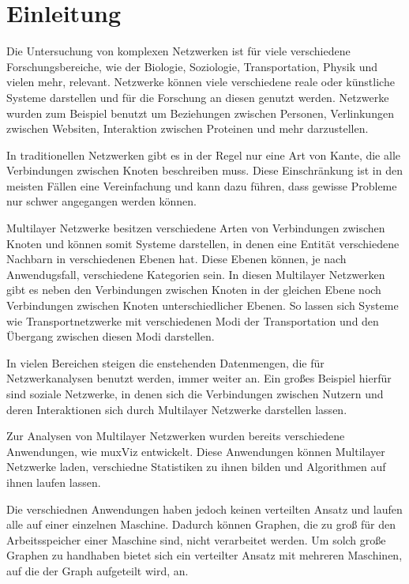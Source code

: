 \chapter{Einleitung}


Die Untersuchung von komplexen Netzwerken ist für viele verschiedene Forschungsbereiche, wie der Biologie, Soziologie, Transportation, Physik und vielen mehr, relevant. 
Netzwerke können viele verschiedene reale oder künstliche Systeme darstellen und für die Forschung an diesen genutzt werden. Netzwerke wurden zum Beispiel benutzt um Beziehungen zwischen Personen, Verlinkungen zwischen Websiten, Interaktion zwischen Proteinen und mehr darzustellen.

In traditionellen Netzwerken gibt es in der Regel nur eine Art von Kante, die alle Verbindungen zwischen Knoten beschreiben muss.
Diese Einschränkung ist in den meisten Fällen eine Vereinfachung und kann dazu führen, dass gewisse Probleme nur schwer angegangen werden können. 

Multilayer Netzwerke besitzen verschiedene Arten von Verbindungen zwischen Knoten und können somit Systeme darstellen, in denen eine Entität verschiedene Nachbarn in verschiedenen Ebenen hat.
Diese Ebenen können, je nach Anwendugsfall, verschiedene Kategorien sein. In diesen Multilayer Netzwerken gibt es neben den Verbindungen zwischen Knoten in der gleichen Ebene noch Verbindungen zwischen Knoten unterschiedlicher Ebenen.
So lassen sich Systeme wie Transportnetzwerke mit verschiedenen Modi der Transportation und den Übergang zwischen diesen Modi darstellen.

In vielen Bereichen steigen die enstehenden Datenmengen, die für Netzwerkanalysen benutzt werden, immer weiter an. Ein großes Beispiel hierfür sind soziale Netzwerke, in denen sich die Verbindungen zwischen Nutzern und deren Interaktionen sich durch Multilayer Netzwerke darstellen lassen.


Zur Analysen von Multilayer Netzwerken wurden bereits verschiedene Anwendungen, wie muxViz entwickelt. Diese Anwendungen können Multilayer Netzwerke laden, verschiedne Statistiken zu ihnen bilden und Algorithmen auf ihnen laufen lassen.

Die verschiednen Anwendungen haben jedoch keinen verteilten Ansatz und laufen alle auf einer einzelnen Maschine. Dadurch können Graphen, die zu groß für den Arbeitsspeicher einer Maschine sind, nicht verarbeitet werden. 
Um solch große Graphen zu handhaben bietet sich ein verteilter Ansatz mit mehreren Maschinen, auf die der Graph aufgeteilt wird, an.


